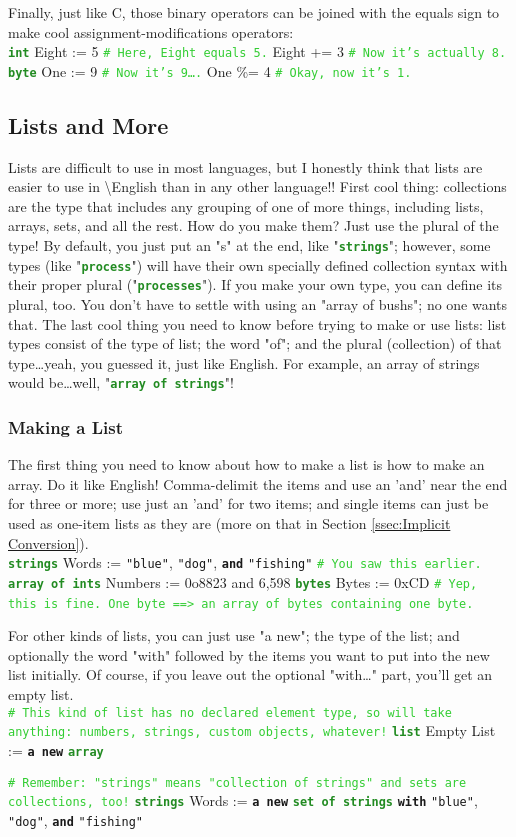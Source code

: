 \documentclass{article}
\newcommand{\name}{\textbackslash{}English}				%
\newcommand{\ssecl}[1]{\subsection{#1}\label{ssec:#1}}
\newcommand{\sssecl}[1]{\subsubsection{#1}\label{sssec:#1}}
\newcommand{\commentline}[1]{\texttt{\textcolor{LimeGreen}{#1}}}
\newcommand{\type}[1]{\texttt{\textcolor{ForestGreen}{\textbf{#1}}}}
\newcommand{\common}[1]{\texttt{\textcolor{Mulberry}{\textbf{#1}}}}
\newcommand{\codestring}[1]{\texttt{\textcolor{NavyBlue}{"#1"}}}
\newenvironment{code}[0]
{\ttfamily{}				%
\setlength\parindent{0cm}	%
~\\}
{\setlength\parindent{1cm}
~\\}
\begin{document}
\indent Finally, just like C, those binary operators can be joined with the equals sign to make cool assignment-modifications operators:
\begin{code}
\type{int} Eight := 5	\commentline{\# Here, Eight equals 5.}
Eight += 3	\commentline{\# Now it's actually 8.}
\\
\type{byte} One := 9	\commentline{\# Now it's 9\ldots.}
One \%= 4	\commentline{\# Okay, now it's 1.}
\end{code}

\ssecl{Lists and More}
\indent Lists are difficult to use in most languages, but I honestly think that lists are easier to use in \name{} than in any other language!!
\indent First cool thing: collections are the type that includes any grouping of one of more things, including lists, arrays, sets, and all the rest. How do you make them? Just use the plural of the type! By default, you just put an "s" at the end, like "\type{strings}"; however, some types (like "\type{process}") will have their own specially defined collection syntax with their proper plural ("\type{processes}"). If you make your own type, you can define its plural, too. You don't have to settle with using an "array of bushs"; no one wants that.
\indent The last cool thing you need to know before trying to make or use lists: list types consist of the type of list; the word "of"; and the plural (collection) of that type\ldots yeah, you guessed it, just like English. For example, an array of strings would be\ldots well, "\type{array of strings}"!

\sssecl{Making a List}
\indent The first thing you need to know about how to make a list is how to make an array. Do it like English! Comma-delimit the items and use an 'and' near the end for three or more; use just an 'and' for two items; and single items can just be used as one-item lists as they are (more on that in Section \ref{ssec:Implicit Conversion}).
\begin{code}
\type{strings} Words := \codestring{blue}, \codestring{dog}, \common{and} \codestring{fishing} \commentline{\# You saw this earlier.}
\type{array of ints} Numbers := 0o8823 and 6,598
\type{bytes} Bytes := 0xCD \commentline{\# Yep, this is fine. One byte ==> an array of bytes containing one byte.}
\end{code}

\indent For other kinds of lists, you can just use "a new"; the type of the list; and optionally the word "with" followed by the items you want to put into the new list initially. Of course, if you leave out the optional "with\ldots" part, you'll get an empty list.
\begin{code}
\commentline{\# This kind of list has no declared element type, so will take anything: numbers, strings, custom objects, whatever!}
\type{list} Empty List := \common{a new} \type{array}

\commentline{\# Remember: "strings" means "collection of strings" and sets are collections, too!}
\type{strings} Words := \common{a new} \type{set of strings} \common{with} \codestring{blue}, \codestring{dog}, \common{and} \codestring{fishing}
\end{code}
\end{document}
